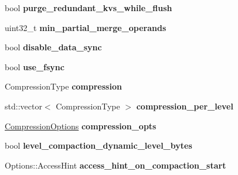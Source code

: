 \begin{DoxyCompactItemize}
\item 
bool {\bfseries purge\+\_\+redundant\+\_\+kvs\+\_\+while\+\_\+flush}\hypertarget{structrocksdb_1_1ImmutableCFOptions_a273116e62ad9dc49f89b1ac6379ad4ff}{}\label{structrocksdb_1_1ImmutableCFOptions_a273116e62ad9dc49f89b1ac6379ad4ff}

\item 
uint32\+\_\+t {\bfseries min\+\_\+partial\+\_\+merge\+\_\+operands}\hypertarget{structrocksdb_1_1ImmutableCFOptions_ae9a584e1563f6b3962b2aa8aeaa742d3}{}\label{structrocksdb_1_1ImmutableCFOptions_ae9a584e1563f6b3962b2aa8aeaa742d3}

\item 
bool {\bfseries disable\+\_\+data\+\_\+sync}\hypertarget{structrocksdb_1_1ImmutableCFOptions_a32b4a26fb68cd7a5225111d64ca2776c}{}\label{structrocksdb_1_1ImmutableCFOptions_a32b4a26fb68cd7a5225111d64ca2776c}

\item 
bool {\bfseries use\+\_\+fsync}\hypertarget{structrocksdb_1_1ImmutableCFOptions_afcdbee323795d6dc70721229905da6e6}{}\label{structrocksdb_1_1ImmutableCFOptions_afcdbee323795d6dc70721229905da6e6}

\item 
Compression\+Type {\bfseries compression}\hypertarget{structrocksdb_1_1ImmutableCFOptions_ad4069596155d1c2ead3c04715c64a20b}{}\label{structrocksdb_1_1ImmutableCFOptions_ad4069596155d1c2ead3c04715c64a20b}

\item 
std\+::vector$<$ Compression\+Type $>$ {\bfseries compression\+\_\+per\+\_\+level}\hypertarget{structrocksdb_1_1ImmutableCFOptions_a45efe1747ba502eecea4e3d68d3b69a3}{}\label{structrocksdb_1_1ImmutableCFOptions_a45efe1747ba502eecea4e3d68d3b69a3}

\item 
\hyperlink{structrocksdb_1_1CompressionOptions}{Compression\+Options} {\bfseries compression\+\_\+opts}\hypertarget{structrocksdb_1_1ImmutableCFOptions_ae4be1819c4016763da0477e14af0124d}{}\label{structrocksdb_1_1ImmutableCFOptions_ae4be1819c4016763da0477e14af0124d}

\item 
bool {\bfseries level\+\_\+compaction\+\_\+dynamic\+\_\+level\+\_\+bytes}\hypertarget{structrocksdb_1_1ImmutableCFOptions_a467e3e949068b6476bdb5890b3ac029f}{}\label{structrocksdb_1_1ImmutableCFOptions_a467e3e949068b6476bdb5890b3ac029f}

\item 
Options\+::\+Access\+Hint {\bfseries access\+\_\+hint\+\_\+on\+\_\+compaction\+\_\+start}\hypertarget{structrocksdb_1_1ImmutableCFOptions_a842c977d0fcac7ceb364be351c5694bc}{}\label{structrocksdb_1_1ImmutableCFOptions_a842c977d0fcac7ceb364be351c5694bc}


\end{DoxyCompactItemize}
